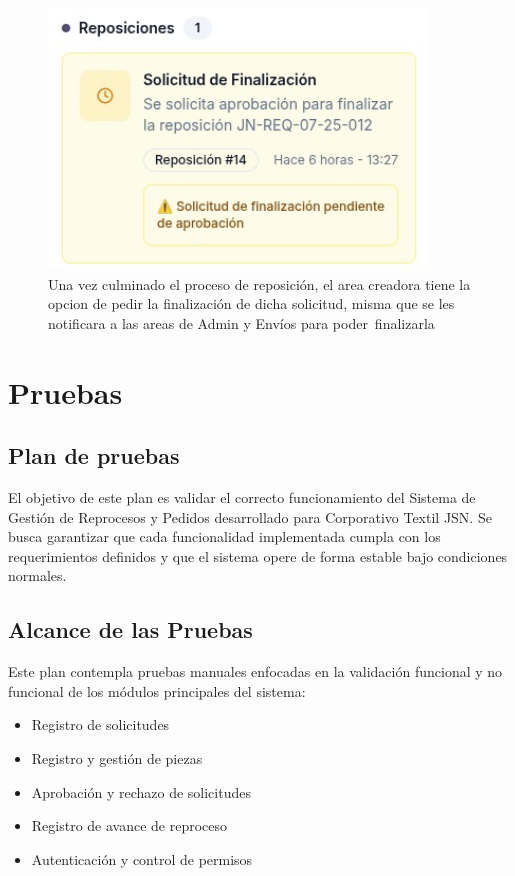\documentclass[12pt,letterpaper,spanish]{report}
\begin{document}
    \begin{figure}
   \centering
   \includegraphics[width=0.9\textwidth]{notifinal.jpg}
   \caption{Una vez culminado el proceso de reposición, el area creadora tiene la opcion de pedir la finalización de dicha solicitud, misma que se les notificara a las areas de Admin y Envíos para poder finalizarla}\label{notifinal}
   \end{figure}
    


\section{Pruebas}

\subsection{Plan de pruebas}
El objetivo de este plan es validar el correcto funcionamiento del Sistema de Gesti\'on de Reprocesos y Pedidos desarrollado para Corporativo Textil JSN. Se busca garantizar que cada funcionalidad implementada cumpla con los requerimientos definidos y que el sistema opere de forma estable bajo condiciones normales.

\subsection{Alcance de las Pruebas}
Este plan contempla pruebas manuales enfocadas en la validaci\'on funcional y no funcional de los m\'odulos principales del sistema:

\begin{itemize}
    \item Registro de solicitudes
    \item Registro y gesti\'on de piezas
    \item Aprobaci\'on y rechazo de solicitudes
    \item Registro de avance de reproceso
    \item Autenticaci\'on y control de permisos
\end{itemize}
\end{document}
